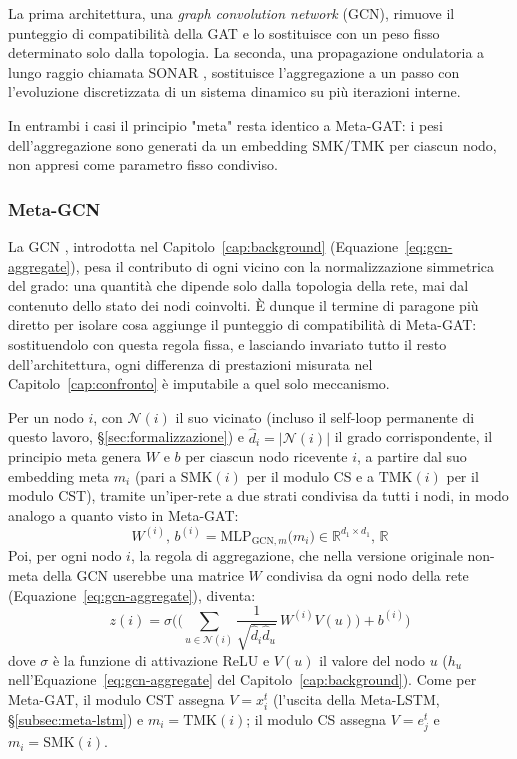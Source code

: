 La prima architettura, una \emph{graph convolution network} (GCN), rimuove il punteggio di compatibilità della GAT e lo sostituisce
con un peso fisso determinato solo dalla topologia.
La seconda, una propagazione ondulatoria a lungo raggio chiamata SONAR \citep{trenta2025sonar},
sostituisce l'aggregazione a un passo con l'evoluzione discretizzata di un sistema dinamico su più iterazioni interne.

In entrambi i casi il principio "meta" resta identico a Meta-GAT:
i pesi dell'aggregazione sono generati da un embedding SMK/TMK per ciascun nodo, non appresi come parametro fisso condiviso.

\subsubsection{Meta-GCN}
\label{subsec:meta-gcn}

La GCN \citep{kipf2017gcn}, introdotta nel Capitolo~\ref{cap:background}
(Equazione~\ref{eq:gcn-aggregate}), pesa il contributo di ogni vicino con la
normalizzazione simmetrica del grado: una quantità che dipende solo dalla
topologia della rete, mai dal contenuto dello stato dei nodi coinvolti. È
dunque il termine di paragone più diretto per isolare cosa aggiunge il
punteggio di compatibilità di Meta-GAT: sostituendolo con questa regola
fissa, e lasciando invariato tutto il resto dell'architettura, ogni
differenza di prestazioni misurata nel Capitolo~\ref{cap:confronto} è
imputabile a quel solo meccanismo.

Per un nodo $i$, con $\mathcal{N}(i)$ il suo vicinato (incluso il self-loop
permanente di questo lavoro, §\ref{sec:formalizzazione}) e $\hat d_i =
  |\mathcal{N}(i)|$ il grado corrispondente, il principio meta genera $W$ e
$b$ per ciascun nodo ricevente $i$, a partire dal suo embedding meta $m_i$
(pari a $\mathrm{SMK}(i)$ per il modulo CS e a $\mathrm{TMK}(i)$ per il
modulo CST), tramite un'iper-rete a due strati condivisa da tutti i nodi,
in modo analogo a quanto visto in Meta-GAT:
\[
  W^{(i)}, \, b^{(i)} = \mathrm{MLP}_{\mathrm{GCN},m}\big(m_i\big) \in \mathbb{R}^{d_1 \times d_1}, \, \mathbb{R}
\]
Poi, per ogni nodo $i$, la regola di aggregazione, che nella versione
originale non-meta della GCN userebbe una matrice $W$ condivisa da ogni
nodo della rete (Equazione~\ref{eq:gcn-aggregate}), diventa:
\begin{equation}
  z(i) = \sigma\Bigg(\bigg(\sum_{u \in \mathcal{N}(i)} \frac{1}{\sqrt{\hat d_i \hat d_u}}\, W^{(i)}V(u)\bigg) + b^{(i)}\Bigg)
  \label{eq:metagcn}
\end{equation}
dove $\sigma$ è la funzione di attivazione ReLU e $V(u)$ il valore del
nodo $u$ ($h_u$ nell'Equazione~\ref{eq:gcn-aggregate} del
Capitolo~\ref{cap:background}). Come per Meta-GAT, il modulo CST assegna
$V=x_i^t$ (l'uscita della Meta-LSTM, §\ref{subsec:meta-lstm}) e
$m_i=\mathrm{TMK}(i)$; il modulo CS assegna $V=e_j^t$ e
$m_i=\mathrm{SMK}(i)$.

